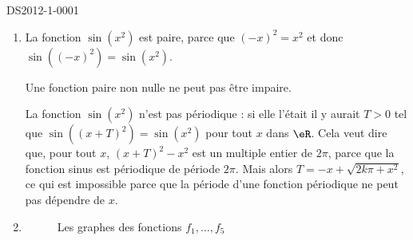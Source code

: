 \begin{corrige}{DS2012-1-0001}
  \begin{enumerate}
  \item La fonction $\sin(x^2)$ est paire, parce que $(-x)^2= x^2$ et donc $\sin((-x)^2)=\sin(x^2)$. 

    Une fonction paire non nulle ne peut pas \^etre impaire. 

    La fonction $\sin(x^2)$ n'est pas p\'eriodique : si elle l'\'etait il y aurait $T> 0$ tel que $\sin((x+T)^2) = \sin(x^2)$ pour tout $x$ dans $\eR$. Cela veut dire que, pour tout $x$, $(x+T)^2-x^2$ est un multiple entier de  $2\pi$, parce que la fonction sinus est p\'eriodique de p\'eriode $2\pi$.  Mais alors $T=-x+\sqrt{2k\pi+x^2}$, ce qui est impossible parce que la p\'eriode d'une fonction p\'eriodique ne peut pas d\'ependre de $x$. 

  \item 
    \begin{figure}[ht!]
      \begin{center}
      \end{center}
      \caption{Les graphes des fonctions $f_1,\ldots, f_5$}
      
    \end{figure}
    
  \end{enumerate}
\end{corrige}
